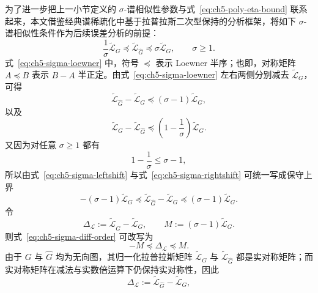 为了进一步把上一小节定义的 $\sigma$-谱相似性参数与式~\eqref{eq:ch5-poly-eta-bound} 联系起来，本文借鉴经典谱稀疏化中基于拉普拉斯二次型保持的分析框架\cite{Spielman2011EffectiveResistances,Spielman2011SpectralSparsification,Batson2013SpectralSparsificationSurvey}，将如下 $\sigma$-谱相似性条件作为后续误差分析的前提：
\begin{equation}
  \frac{1}{\sigma}\tilde{\mathcal{L}}_G
  \preceq
  \tilde{\mathcal{L}}_{\hat G}
  \preceq
  \sigma \tilde{\mathcal{L}}_G,
  \qquad \sigma\ge 1.
  \label{eq:ch5-sigma-loewner}
\end{equation}
式~\eqref{eq:ch5-sigma-loewner} 中，符号 $\preceq$ 表示 Loewner 半序；也即，对称矩阵 $A\preceq B$ 表示 $B-A$ 半正定。由式~\eqref{eq:ch5-sigma-loewner} 左右两侧分别减去 $\tilde{\mathcal{L}}_G$，可得
\begin{equation}
  \tilde{\mathcal{L}}_{\hat G}-\tilde{\mathcal{L}}_G
  \preceq
  (\sigma-1)\tilde{\mathcal{L}}_G,
  \label{eq:ch5-sigma-leftshift}
\end{equation}
以及
\begin{equation}
  \tilde{\mathcal{L}}_G-\tilde{\mathcal{L}}_{\hat G}
  \preceq
  \left(1-\frac{1}{\sigma}\right)\tilde{\mathcal{L}}_G.
  \label{eq:ch5-sigma-rightshift}
\end{equation}
又因为对任意 $\sigma\ge 1$ 都有
\begin{equation}
  1-\frac{1}{\sigma}\le \sigma-1,
  \label{eq:ch5-sigma-ineq}
\end{equation}
所以由式~\eqref{eq:ch5-sigma-leftshift} 与式~\eqref{eq:ch5-sigma-rightshift} 可统一写成保守上界
\begin{equation}
  -(\sigma-1)\tilde{\mathcal{L}}_G
  \preceq
  \tilde{\mathcal{L}}_{\hat G}-\tilde{\mathcal{L}}_G
  \preceq
  (\sigma-1)\tilde{\mathcal{L}}_G.
  \label{eq:ch5-sigma-diff-order}
\end{equation}
令
\begin{equation}
  \Delta_{\mathcal{L}}
  :=
  \tilde{\mathcal{L}}_{\hat G}-\tilde{\mathcal{L}}_G,
  \qquad
  M
  :=
  (\sigma-1)\tilde{\mathcal{L}}_G.
  \label{eq:ch5-DM-def}
\end{equation}
则式~\eqref{eq:ch5-sigma-diff-order} 可改写为
\begin{equation}
  -M \preceq \Delta_{\mathcal{L}} \preceq M.
  \label{eq:ch5-D-bounded-by-M}
\end{equation}
由于 $G$ 与 $\hat G$ 均为无向图，其归一化拉普拉斯矩阵 $\tilde{\mathcal{L}}_G$ 与 $\tilde{\mathcal{L}}_{\hat G}$ 都是实对称矩阵；而实对称矩阵在减法与实数倍运算下仍保持实对称性，因此
\begin{equation}
  \Delta_{\mathcal{L}}
  :=
  \tilde{\mathcal{L}}_{\hat G}-\tilde{\mathcal{L}}_G,
\end{equation}
